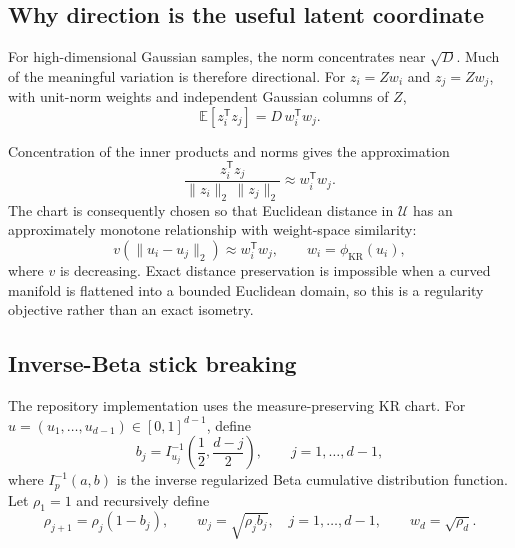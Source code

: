 \documentclass[11pt]{article}
\newcommand{\norm}[1]{\lVert #1 \rVert_2}
\begin{document}
\subsection{Why direction is the useful latent coordinate}

For high-dimensional Gaussian samples, the norm concentrates near
\(\sqrt{D}\).  Much of the meaningful variation is therefore directional.
For \(z_i=Zw_i\) and \(z_j=Zw_j\), with unit-norm weights and independent
Gaussian columns of \(Z\),
\begin{equation}
    \mathbb{E}\!\left[z_i^{\mathsf T}z_j\right]
    =D\,w_i^{\mathsf T}w_j.
    \label{eq:expected-inner-product}
\end{equation}

Concentration of the inner products and norms gives the approximation
\begin{equation}
    \frac{z_i^{\mathsf T}z_j}{\norm{z_i}\,\norm{z_j}}
    \approx w_i^{\mathsf T}w_j.
    \label{eq:cosine-approximation}
\end{equation}
The chart is consequently chosen so that Euclidean distance in \(\mathcal{U}\)
has an approximately monotone relationship with weight-space similarity:
\begin{equation}
    v\!\left(\norm{u_i-u_j}\right)
    \approx w_i^{\mathsf T}w_j,
    \qquad w_i=\phi_{\mathrm{KR}}(u_i),
    \label{eq:chart-similarity}
\end{equation}
where \(v\) is decreasing.  Exact distance preservation is impossible when a
curved manifold is flattened into a bounded Euclidean domain, so this is a
regularity objective rather than an exact isometry.

\subsection{Inverse-Beta stick breaking}
\label{sec:stick-breaking}

The repository implementation uses the measure-preserving KR chart.  For
\(u=(u_1,\ldots,u_{d-1})\in[0,1]^{d-1}\), define
\begin{equation}
    b_j=I^{-1}_{u_j}\!\left(\frac12,\frac{d-j}{2}\right),
    \qquad j=1,\ldots,d-1,
    \label{eq:inverse-beta}
\end{equation}
where \(I^{-1}_{p}(a,b)\) is the inverse regularized Beta cumulative
distribution function.  Let \(\rho_1=1\) and recursively define
\begin{equation}
    \rho_{j+1}=\rho_j(1-b_j),
    \qquad
    w_j=\sqrt{\rho_j b_j},
    \quad j=1,\ldots,d-1,
    \qquad
    w_d=\sqrt{\rho_d}.
    \label{eq:kr-weights}
\end{equation}
\end{document}
